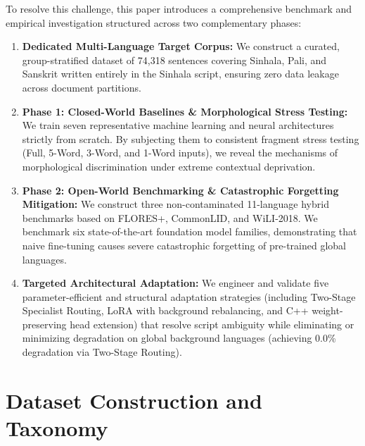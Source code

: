 \documentclass[11pt]{article}
\begin{document}
To resolve this challenge, this paper introduces a comprehensive benchmark and empirical investigation structured across two complementary phases:
\begin{enumerate}
    \item \textbf{Dedicated Multi-Language Target Corpus:} We construct a curated, group-stratified dataset of 74,318 sentences covering Sinhala, Pali, and Sanskrit written entirely in the Sinhala script, ensuring zero data leakage across document partitions.
    \item \textbf{Phase 1: Closed-World Baselines \& Morphological Stress Testing:} We train seven representative machine learning and neural architectures strictly from scratch. By subjecting them to consistent fragment stress testing (Full, 5-Word, 3-Word, and 1-Word inputs), we reveal the mechanisms of morphological discrimination under extreme contextual deprivation.
    \item \textbf{Phase 2: Open-World Benchmarking \& Catastrophic Forgetting Mitigation:} We construct three non-contaminated 11-language hybrid benchmarks based on FLORES+, CommonLID, and WiLI-2018. We benchmark six state-of-the-art foundation model families, demonstrating that naive fine-tuning causes severe catastrophic forgetting of pre-trained global languages.
    \item \textbf{Targeted Architectural Adaptation:} We engineer and validate five parameter-efficient and structural adaptation strategies (including Two-Stage Specialist Routing, LoRA with background rebalancing, and C++ weight-preserving head extension) that resolve script ambiguity while eliminating or minimizing degradation on global background languages (achieving 0.0\% degradation via Two-Stage Routing).
    
\end{enumerate}

\section{Dataset Construction and Taxonomy}
\end{document}
